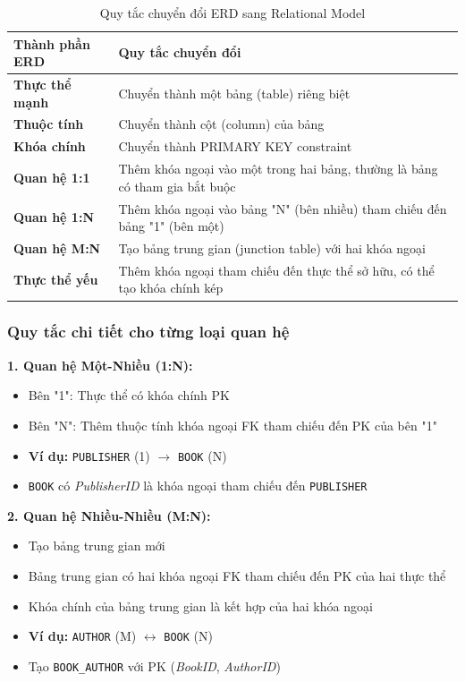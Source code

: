 \documentclass[12pt,a4paper]{article}
\newcommand{\entity}[1]{\texttt{#1}}
\newcommand{\attr}[1]{\textit{#1}}
\begin{document}
\begin{table}[H]
\centering
\caption{Quy tắc chuyển đổi ERD sang Relational Model}
\begin{tabular}{@{}|l|p{9cm}|@{}}
\hline
\textbf{Thành phần ERD} & \textbf{Quy tắc chuyển đổi} \\ \hline
\textbf{Thực thể mạnh} & Chuyển thành một bảng (table) riêng biệt \\ \hline
\textbf{Thuộc tính} & Chuyển thành cột (column) của bảng \\ \hline
\textbf{Khóa chính} & Chuyển thành PRIMARY KEY constraint \\ \hline
\textbf{Quan hệ 1:1} & Thêm khóa ngoại vào một trong hai bảng, thường là bảng có tham gia bắt buộc \\ \hline
\textbf{Quan hệ 1:N} & Thêm khóa ngoại vào bảng "N" (bên nhiều) tham chiếu đến bảng "1" (bên một) \\ \hline
\textbf{Quan hệ M:N} & Tạo bảng trung gian (junction table) với hai khóa ngoại \\ \hline
\textbf{Thực thể yếu} & Thêm khóa ngoại tham chiếu đến thực thể sở hữu, có thể tạo khóa chính kép \\ \hline
\end{tabular}
\end{table}

\subsubsection{Quy tắc chi tiết cho từng loại quan hệ}

\textbf{1. Quan hệ Một-Nhiều (1:N):}

\begin{itemize}
    \item Bên "1": Thực thể có khóa chính PK
    \item Bên "N": Thêm thuộc tính khóa ngoại FK tham chiếu đến PK của bên "1"
    \item \textbf{Ví dụ:} \entity{PUBLISHER} (1) $\rightarrow$ \entity{BOOK} (N)
    \item \entity{BOOK} có \attr{PublisherID} là khóa ngoại tham chiếu đến \entity{PUBLISHER}
\end{itemize}

\textbf{2. Quan hệ Nhiều-Nhiều (M:N):}

\begin{itemize}
    \item Tạo bảng trung gian mới
    \item Bảng trung gian có hai khóa ngoại FK tham chiếu đến PK của hai thực thể
    \item Khóa chính của bảng trung gian là kết hợp của hai khóa ngoại
    \item \textbf{Ví dụ:} \entity{AUTHOR} (M) $\leftrightarrow$ \entity{BOOK} (N)
    \item Tạo \entity{BOOK\_AUTHOR} với PK (\attr{BookID}, \attr{AuthorID})
\end{itemize}
\end{document}
